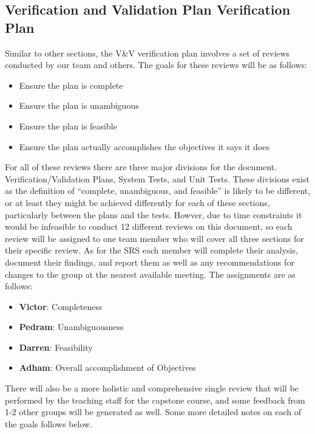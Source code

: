 \documentclass[12pt, titlepage]{article}
\begin{document}
\subsection{Verification and Validation Plan Verification Plan}
Similar to other sections, the V\&V verification plan involves a set of reviews conducted by our team and others. The goals for these reviews will be as follows:
\begin{itemize}
\item Ensure the plan is complete
\item	Ensure the plan is unambiguous
\item	Ensure the plan is feasible
\item	Ensure the plan actually accomplishes the objectives it says it does
\end{itemize} 
For all of these reviews there are three major divisions for the document. Verification/Validation Plans, System Tests, and Unit Tests. These divisions exist as the definition
of “complete, unambiguous, and feasible” is likely to be different, or at least they might be achieved differently for each of these sections, particularly between the plans
and the tests. Howver, due to time constraints it would be infeasible to conduct 12 different reviews on this document, so each review will be assigned to one team member who
will cover all three sections for their specific review. As for the SRS each member will complete their analysis, document their findings, and report them as well as any
recommendations for changes to the group at the nearest available meeting. The assignments are as follows:
\begin{itemize}
  \item \textbf{Victor}: Completeness\\
  \item \textbf{Pedram}: Unambiguousness\\
  \item \textbf{Darren}: Feasibility\\
  \item \textbf{Adham}: Overall accomplishment of Objectives\\
  \end{itemize} 
There will also be a more holistic and comprehensive single review that will be performed by the teaching staff for the capstone course, 
and some feedback from 1-2 other groups will be generated as well. Some more detailed notes on each of the goals follows below.\\\\ 
\end{document}
